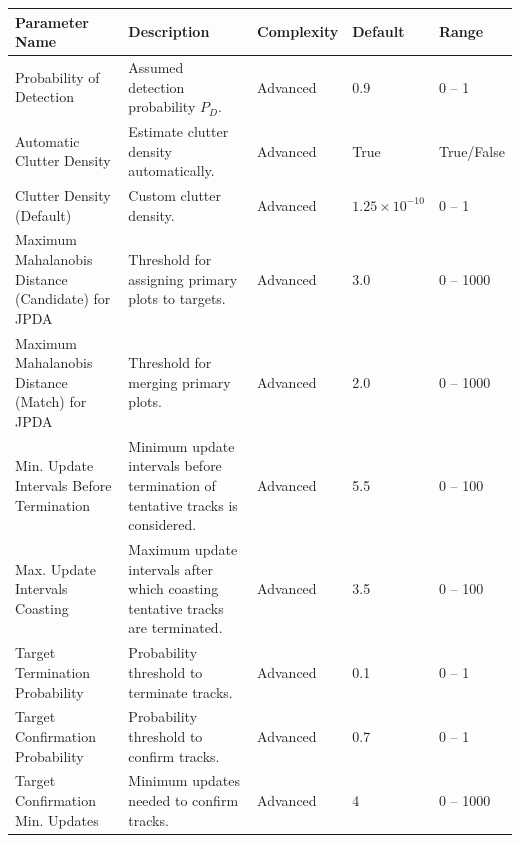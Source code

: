 \begin{table}[H]
    \centering
    \footnotesize
    \hspace*{-1.5cm}
    \begin{tabular}{|p{4.5cm}|p{6.5cm}|l|l|l|}
    \hline
    \textbf{Parameter Name} & \textbf{Description} & \textbf{Complexity} & \textbf{Default} & \textbf{Range} \\ \hline
    Probability of Detection & Assumed detection probability $P_D$. & Advanced & 0.9 & 0 -- 1 \\ \hline
    Automatic Clutter Density & Estimate clutter density automatically. & Advanced & True & True/False \\ \hline
    Clutter Density (Default) & Custom clutter density. & Advanced & $1.25 \times 10^{-10}$ & 0 -- 1 \\ \hline
    Maximum Mahalanobis Distance (Candidate) for JPDA & Threshold for assigning primary plots to targets. & Advanced & 3.0 & 0 -- 1000 \\ \hline
    Maximum Mahalanobis Distance (Match) for JPDA & Threshold for merging primary plots. & Advanced & 2.0 & 0 -- 1000 \\ \hline
    Min. Update Intervals Before Termination & Minimum update intervals before termination of tentative tracks is considered. & Advanced & 5.5 & 0 -- 100 \\ \hline
    Max. Update Intervals Coasting & Maximum update intervals after which coasting tentative tracks are terminated. & Advanced & 3.5 & 0 -- 100 \\ \hline
    Target Termination Probability & Probability threshold to terminate tracks. & Advanced & 0.1 & 0 -- 1 \\ \hline 
    Target Confirmation Probability & Probability threshold to confirm tracks. & Advanced & 0.7 & 0 -- 1 \\ \hline
    Target Confirmation Min. Updates & Minimum updates needed to confirm tracks. & Advanced & 4 & 0 -- 1000 \\ \hline
    \end{tabular}
\end{table}

